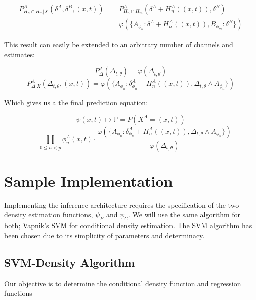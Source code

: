 \documentclass[10pt]{article}
\begin{document}
\begin{align}
P_{H_n \cap H_m | X}^A \left( \delta^A, \delta^B, (x,t) \right) &= P_{H_n \cap H_m}^A \left( \delta^A + H_n^A((x,t)), \delta^B \right) \nonumber \\
&= \varphi \left( \{ A_{\phi_n}:\delta^A + H_n^A((x,t)), B_{\phi_m}: \delta^B \} \right)
\end{align}

This result can easily be extended to an arbitrary number of channels and estimates:

\begin{equation} P_\Delta^A \left( \Delta_{t,\theta} \right) = \varphi \left( \Delta_{t,\theta} \right) \end{equation}
\begin{equation} P_{\Delta|X}^A \left( \Delta_{t,\theta}, (x,t) \right) = \varphi \left( \{ A_{\phi_n} : \delta_{\phi_n}^A + H_n^A((x,t)), \Delta_{t,\theta} \land A_{\phi_n} \} \right) \end{equation}

Which gives us a the final prediction equation:

\[ \psi(x,t) \mapsto \mathbb{P} = P(X^A = (x,t) ) \]
\begin{equation} 
= \prod_{0 \le n < p} \phi_n^A( x, t) \cdot \frac{ \varphi \left( \{ A_{\phi_n} : \delta_{\phi_n}^A + H_n^A((x,t)), \Delta_{t,\theta} \land A_{\phi_n} \} \right) }{ \varphi( \Delta_{t,\theta} ) }
\end{equation}

\section{Sample Implementation}
Implementing the inference architecture requires the specification of the two density estimation functions, \( \psi_E \) and \( \psi_C \).  We will use the same algorithm for both; Vapnik's SVM for conditional density estimation.  The SVM algorithm has been chosen due to its simplicity of parameters and determinacy. 

 
\subsection{SVM-Density Algorithm}

Our objective is to determine the conditional density function and regression functions
\end{document}
